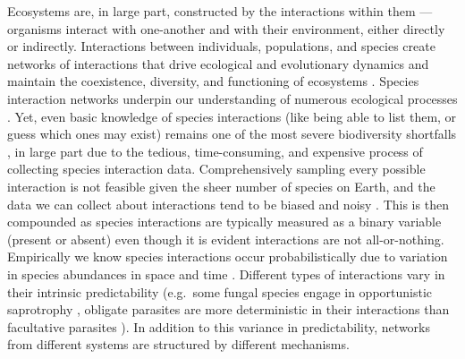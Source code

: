 Ecosystems are, in large part, constructed by the interactions within
them --- organisms interact with one-another and with their environment,
either directly or indirectly. Interactions between individuals,
populations, and species create networks of interactions that drive
ecological and evolutionary dynamics and maintain the coexistence,
diversity, and functioning of ecosystems \cite{Delmas2018AnaEco,
Landi2018ComSta, Albrecht2018PlaAni}. Species interaction networks
underpin our understanding of numerous ecological processes
\cite{Pascual2006EcoNet, Heleno2014EcoNet}. Yet, even basic knowledge
of species interactions (like being able to list them, or guess which
ones may exist) remains one of the most severe biodiversity shortfalls
\cite{Hortal2015SevSho}, in large part due to the tedious,
time-consuming, and expensive process of collecting species interaction
data. Comprehensively sampling every possible interaction is not
feasible given the sheer number of species on Earth, and the data we can
collect about interactions tend to be biased and noisy
\cite{deAguiar2019RevBia}. This is then compounded as species
interactions are typically measured as a binary variable (present or
absent) even though it is evident interactions are not all-or-nothing.
Empirically we know species interactions occur probabilistically due to
variation in species abundances in space and time
\cite{Poisot2015SpeWhy}. Different types of interactions vary in their
intrinsic predictability (e.g.~some fungal species engage in
opportunistic saprotrophy \cite{Smith2017GroEvi}, obligate parasites are
more deterministic in their interactions than facultative parasites
\cite{Poisot2013FacObl, Luong2019FacPar}). In addition to this variance
in predictability, networks from different systems are structured by
different mechanisms.

